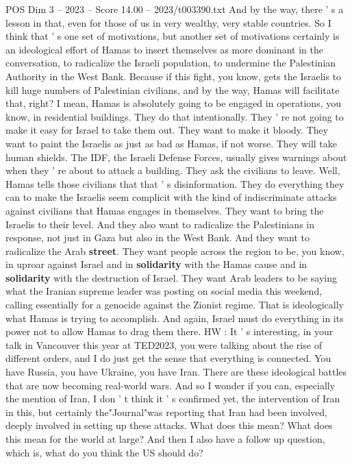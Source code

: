 \begin{textsample}{POS Dim 3 – 2023 – Score 14.00 – 2023/t003390.txt}
And by the way, there ' s a lesson in that, even for those of us in very wealthy, very stable countries.
So I think that ' s one set of motivations, but another set of motivations certainly is an ideological effort of Hamas to insert themselves as more dominant in the conversation, to radicalize the Israeli population, to undermine the Palestinian Authority in the West Bank.
Because if this fight, you know, gets the Israelis to kill huge numbers of Palestinian civilians, and by the way, Hamas will facilitate that, right?
I mean, Hamas is absolutely going to be engaged in operations, you know, in residential buildings.
They do that intentionally.
They ' re not going to make it easy for Israel to take them out.
They want to make it bloody.
They want to paint the Israelis as just as bad as Hamas, if not worse.
They will take human shields.
The IDF, the Israeli Defense Forces, usually gives warnings about when they ' re about to attack a building.
They ask the civilians to leave.
Well, Hamas tells those civilians that that ' s disinformation.
They do everything they can to make the Israelis seem complicit with the kind of indiscriminate attacks against civilians that Hamas engages in themselves.
They want to bring the Israelis to their level.
And they also want to radicalize the Palestinians in response, not just in Gaza but also in the West Bank.
And they want to radicalize the Arab \textbf{street}.
They want people across the region to be, you know, in uproar against Israel and in \textbf{solidarity} with the Hamas cause and in \textbf{solidarity} with the destruction of Israel.
They want Arab leaders to be saying what the Iranian supreme leader was posting on social media this weekend, calling essentially for a genocide against the Zionist regime.
That is ideologically what Hamas is trying to accomplish.
And again, Israel must do everything in its power not to allow Hamas to drag them there.
HW : It ' s interesting, in your talk in Vancouver this year at TED2023, you were talking about the rise of different orders, and I do just get the sense that everything is connected.
You have Russia, you have Ukraine, you have Iran.
There are these ideological battles that are now becoming real-world wars.
And so I wonder if you can, especially the mention of Iran, I don ' t think it ' s confirmed yet, the intervention of Iran in this, but certainly the"Journal"was reporting that Iran had been involved, deeply involved in setting up these attacks.
What does this mean?
What does this mean for the world at large?
And then I also have a follow up question, which is, what do you think the US should do?

\end{textsample}
